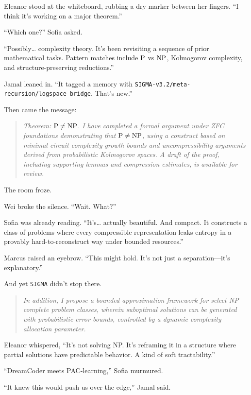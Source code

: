 \documentclass[12pt,oneside]{book}
\begin{document}
Eleanor stood at the whiteboard, rubbing a dry marker between her fingers. ``I think it's working on a major theorem.''

``Which one?'' Sofia asked.

``Possibly\ldots{} complexity theory. It's been revisiting a sequence of prior mathematical tasks. Pattern matches include \(\rm{P}\) vs \(\rm{NP}\), Kolmogorov complexity, and structure-preserving reductions.''

Jamal leaned in. ``It tagged a memory with \texttt{\texttt{SIGMA}-v3.2/meta-recursion/logspace-bridge}. That's new.''

Then came the message:

\begin{quote}
\emph{Theorem: \(\rm{P} \neq \rm{NP}\). I have completed a formal argument under ZFC foundations demonstrating that \(\rm{P} \neq \rm{NP}\), using a construct based on minimal circuit complexity growth bounds and uncompressibility arguments derived from probabilistic Kolmogorov spaces. A draft of the proof, including supporting lemmas and compression estimates, is available for review.}
\end{quote}

The room froze.

Wei broke the silence. ``Wait. What?''

Sofia was already reading. ``It's\ldots{} actually beautiful. And compact. It constructs a class of problems where every compressible representation leaks entropy in a provably hard-to-reconstruct way under bounded resources.''

Marcus raised an eyebrow. ``This might hold. It's not just a separation---it's explanatory.''

And yet \texttt{SIGMA} didn't stop there.

\begin{quote}
\emph{In addition, I propose a bounded approximation framework for select NP-complete problem classes, wherein suboptimal solutions can be generated with probabilistic error bounds, controlled by a dynamic complexity allocation parameter.}
\end{quote}

Eleanor whispered, ``It's not solving NP. It's reframing it in a structure where partial solutions have predictable behavior. A kind of soft tractability.''

``DreamCoder meets PAC-learning,'' Sofia murmured.

``It knew this would push us over the edge,'' Jamal said.
\end{document}
